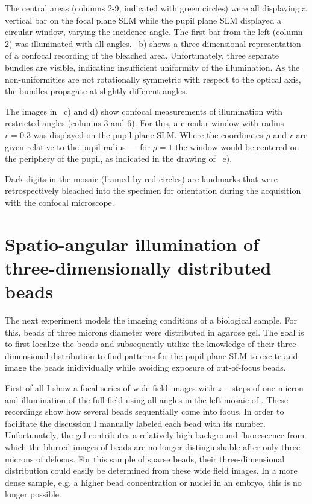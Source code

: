 The  central areas (columns 2-9,
indicated with green circles) were all displaying a vertical bar on
the focal plane SLM while the pupil plane SLM displayed a circular
window, varying the incidence angle. The first bar from the left
(column 2) was illuminated with all
angles. ~b) shows a three-dimensional
representation of a confocal recording of the bleached
area. Unfortunately, three separate bundles are visible, indicating
insufficient uniformity of the illumination.  As the non-uniformities
are not rotationally symmetric with respect to the optical axis, the
bundles propagate at slightly different angles.

The images in ~c) and d) show confocal
measurements of illumination with restricted angles (columns 3 and
6). For this, a circular window with radius $r=0.3$ was displayed on
the pupil plane SLM. Where the coordinates $\rho$ and $r$ are given
relative to the pupil radius --- for $\rho=1$ the window would be
centered on the periphery of the pupil, as indicated in the drawing
of ~e).

Dark digits in the mosaic (framed by red circles) are landmarks that were
retrospectively bleached into the specimen for orientation during the
acquisition with the confocal microscope.



\section{Spatio-angular illumination of three-dimensionally distributed beads}
\label{sec:beads_under}
The next experiment models the imaging conditions of a biological
sample. For this, beads of three microns diameter were distributed in
agarose gel. The goal is to first localize the beads and subsequently
utilize the knowledge of their three-dimensional distribution to find
patterns for the pupil plane SLM to excite and image the beads
inidividually while avoiding exposure of out-of-focus beads.

First of all  I show a focal series of wide
field images with $z-$steps of one micron and illumination of the full
field using all angles in the left mosaic of . These
recordings show how several beads sequentially come into focus. In
order to facilitate the discussion I manually labeled each bead with
its number. Unfortunately, the gel contributes a relatively high
background fluorescence from which the blurred images of beads are no
longer distinguishable after only three microns of defocus. For this
sample of sparse beads, their three-dimensional distribution could
easily be determined from these wide field images. In a more dense
sample, e.g. a higher bead concentration or nuclei in an embryo, this
is no longer possible.


